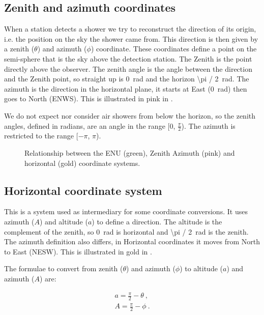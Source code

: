 \subsection{Zenith and azimuth coordinates}

When a station detects a shower we try to reconstruct the direction of
its origin, i.e. the position on the sky the shower came from. This
direction is then given by a zenith ($\theta$) and azimuth ($\phi$)
coordinate. These coordinates define a point on the semi-sphere that is
the sky above the detection station. The Zenith is the point directly
above the observer. The zenith angle is the angle between the direction
and the Zenith point, so straight up is \SI{0}{\radian} and the horizon
\SI{\pi / 2}{\radian}. The azimuth is the direction in the horizontal
plane, it starts at East (\SI{0}{\radian}) then goes to North (ENWS).
This is illustrated in pink in .

We do not expect nor consider air showers from below the horizon, so the
zenith angles, defined in radians, are an angle in the range [0,
$\frac{\pi}{2}$). The azimuth is restricted to the range [$-\pi$, $\pi$).

\begin{figure}
    \centering
    
    \caption{Relationship between the ENU (green), Zenith Azimuth (pink)
             and horizontal (gold) coordinate systems.}
    \label{fig:enu_horizontal}
\end{figure}


\subsection{Horizontal coordinate system}

This is a system used as intermediary for some coordinate conversions.
It uses azimuth ($A$) and altitude ($a$) to define a direction. The
altitude is the complement of the zenith, so \SI{0}{\radian} is horizontal
and \SI{\pi / 2}{\radian} is the zenith. The azimuth definition also
differs, in Horizontal coordinates it moves from North to East (NESW).
This is illustrated in gold in .

The formulae to convert from zenith ($\theta$) and azimuth ($\phi$) to
altitude ($a$) and azimuth ($A$) are:

\begin{equation}
    \begin{array}{l}
        a = \frac{\pi}{2} - \theta \ , \\
        A = \frac{\pi}{2} - \phi \ .
    \end{array}
\end{equation}


